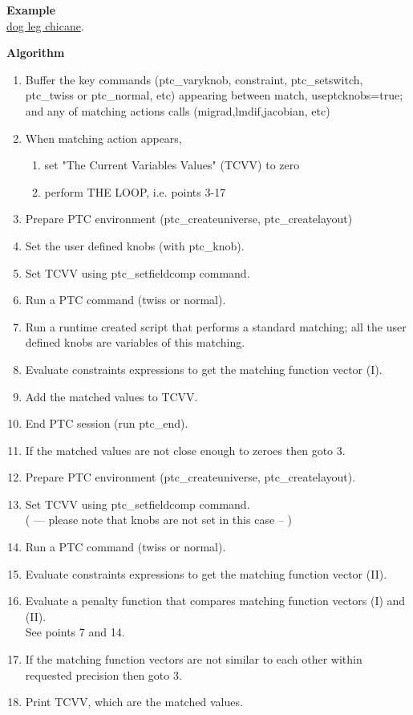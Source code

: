 {\bf Example}\\
\href{http://cern.ch/frs/mad-X_examples/ptc_madx_interface/matchknobs/.madx}{dog leg chicane}.

{\bf Algorithm}\\
\begin{enumerate}
   \item Buffer the key commands (ptc\_varyknob, constraint,
     ptc\_setswitch, ptc\_twiss or ptc\_normal, etc) appearing between 
     match, useptcknobs=true; and any of matching actions calls
     (migrad,lmdif,jacobian, etc) 
   \item  When matching action appears,  
     \begin{enumerate}
       \item set "The Current Variables Values" (TCVV) to zero      
       \item perform THE LOOP, i.e. points 3-17 
     \end{enumerate}
   \item Prepare PTC environment (ptc\_createuniverse,
     ptc\_createlayout)  
   \item Set the user defined knobs (with ptc\_knob).  
   \item Set TCVV using ptc\_setfieldcomp command.  
   \item Run a PTC command (twiss or normal).  
   \item Run a runtime created script that performs a standard matching;
     all the user defined knobs are variables of this matching.  
   \item Evaluate constraints expressions to get the matching function
     vector (I). 
   \item Add the matched values to TCVV. 
   \item End PTC session (run ptc\_end). 
   \item If the matched values are not close enough to zeroes then goto 3.
   \item Prepare PTC environment (ptc\_createuniverse,
     ptc\_createlayout). 
   \item Set TCVV using ptc\_setfieldcomp command.
     \\   ( --- please note that knobs are not set in this case  -- )  
   \item Run a PTC command (twiss or normal).
   \item Evaluate constraints expressions to get the matching function
     vector (II). 
   \item Evaluate a penalty function that compares matching function
     vectors (I) and (II).\\     See points 7 and 14.
   \item If the matching function vectors are not similar to each other
     within requested precision then goto 3. 
   \item Print TCVV, which are the matched values. 
\end{enumerate}



